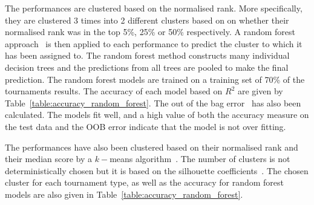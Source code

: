The performances are clustered based on the normalised rank. More specifically,
they are clustered 3 times into 2 different clusters based on  on whether their
normalised rank was in the top 5\%, 25\% or 50\% respectively. A random forest
approach~\cite{breiman2001} is then applied to each performance to predict the cluster to
which it has been assigned to. The random forest method
constructs many individual decision trees and the predictions from all trees are
pooled to make the final prediction. The random forest models are trained on a
training set of 70\% of the tournaments results. The accuracy of each model
based on $R^2$ are given by Table~\ref{table:accuracy_random_forest}. The out of
the bag error~\cite{hastie2005} has also been calculated. The models fit well,
and a high value of both the accuracy measure on the test data and the OOB error
indicate that the model is not over fitting.

The performances have also been clustered based on their normalised rank and
their median score by a \(k-\)means algorithm~\cite{Arthur2007}. The number of
clusters is not deterministically chosen but it is based on the silhouette
coefficients~\cite{Rousseeuw1987}. The chosen cluster for each tournament type,
as well as the accuracy for random forest models are also given in
Table~\ref{table:accuracy_random_forest}.

